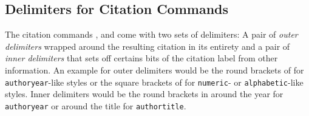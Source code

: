 \documentclass{ltxdockit}
\def\sty{\texttt}
\begin{document}
\subsection{Delimiters for Citation Commands}
The citation commands ,  and  come with
two sets of delimiters: A pair of \emph{outer delimiters} wrapped around the
resulting citation in its entirety and a pair of \emph{inner delimiters} that
sets off certains bits of the citation label from other information.
An example for outer delimiters would be the round brackets of 
for \texttt{author\-year}-like styles or the square brackets of  for 
\sty{numeric}- or \sty{alphabetic}-like styles.
Inner delimiters would be the round brackets in  around
the year for \sty{authoryear} or around the title for \sty{authortitle}.
\end{document}
